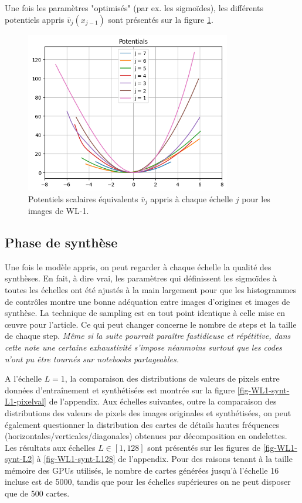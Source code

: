 \documentclass[12pt,twoside]{article}
\begin{document}
Une fois les paramètres "optimisés" (par ex. les sigmoïdes), les différents potentiels appris $\bar{v}_j(x_{j-1})$ sont présentés sur la figure \ref{fig-WL1-potentiels-optim}.

\begin{figure}
\centering
\includegraphics[width=0.8\textwidth]{fig-WL1-potentiels-optim.png}
\caption{Potentiels scalaires équivalents $\bar{v}_j$ appris à chaque échelle $j$ pour les images de WL-1.}
\label{fig-WL1-potentiels-optim}
\end{figure}
%
\subsection{Phase de synthèse}
\label{sec-wcrg-WL1-synt}
%
Une fois le modèle appris, on peut regarder à chaque échelle la qualité des synthèses. En fait, à dire vrai, les paramètres qui définissent les sigmoïdes à toutes les échelles ont été ajustés à la main largement pour que les histogrammes de contrôles montre une bonne adéquation entre images d'origines et images de synthèse. La technique de sampling est en tout point identique à celle mise en œuvre pour l'article. Ce qui peut changer concerne le nombre de steps et la taille de chaque step. \textit{Même si la suite pourrait paraître fastidieuse et répétitive, dans cette note une certaine exhaustivité s'impose néanmoins surtout que les codes n'ont pu être tournés sur notebooks partageables.} 

A l'échelle $L=1$, la comparaison des distributions de valeurs de pixels entre données d'entraînement et synthétisées est montrée sur la figure \ref{fig-WL1-synt-L1-pixelval} de l'appendix. Aux échelles suivantes, outre la comparaison des distributions des valeurs de pixels des images originales et synthétisées, on peut également questionner la distribution des cartes de détails hautes fréquences (horizontales/verticales/diagonales) obtenues par décomposition en ondelettes.
Les résultats aux échelles $L\in[1,128]$ sont présentés sur les figures de \ref{fig-WL1-synt-L2} à \ref{fig-WL1-synt-L128} de l'appendix. Pour des raisons tenant à la taille mémoire des GPUs utilisés, le nombre de cartes générées jusqu'à l'échelle 16 incluse est de 5000, tandis que pour les échelles supérieures on ne peut disposer que de 500 cartes.
\end{document}
